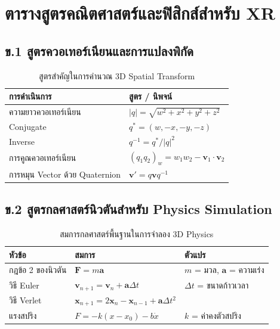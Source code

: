 \chapter{ตารางสูตรคณิตศาสตร์และฟิสิกส์สำหรับ XR}
\label{app:B}

\section*{ข.1 สูตรควอเทอร์เนียนและการแปลงพิกัด}

\begin{table}[H]
\centering
\caption{สูตรสำคัญในการคำนวณ 3D Spatial Transform}
\begin{tabularx}{\textwidth}{lY}
\toprule
\textbf{การดำเนินการ} & \textbf{สูตร / นิพจน์} \\
\midrule
ความยาวควอเทอร์เนียน & $|q| = \sqrt{w^2 + x^2 + y^2 + z^2}$ \\
Conjugate & $q^* = (w, -x, -y, -z)$ \\
Inverse & $q^{-1} = q^* / |q|^2$ \\
การคูณควอเทอร์เนียน & $(q_1 q_2)_w = w_1w_2 - \mathbf{v}_1\cdot\mathbf{v}_2$ \\
การหมุน Vector ด้วย Quaternion & $\mathbf{v'} = q \mathbf{v} q^{-1}$ \\
\bottomrule
\end{tabularx}
\end{table}

\section*{ข.2 สูตรกลศาสตร์นิวตันสำหรับ Physics Simulation}

\begin{table}[H]
\centering
\caption{สมการกลศาสตร์พื้นฐานในการจำลอง 3D Physics}
\begin{tabularx}{\textwidth}{lYY}
\toprule
\textbf{หัวข้อ} & \textbf{สมการ} & \textbf{ตัวแปร} \\
\midrule
กฎข้อ 2 ของนิวตัน & $\mathbf{F} = m\mathbf{a}$ & $m$ = มวล, $\mathbf{a}$ = ความเร่ง \\
วิธี Euler & $\mathbf{v}_{n+1} = \mathbf{v}_n + \mathbf{a}\Delta t$ & $\Delta t$ = ขนาดก้าวเวลา \\
วิธี Verlet & $\mathbf{x}_{n+1} = 2\mathbf{x}_n - \mathbf{x}_{n-1} + \mathbf{a}\Delta t^2$ & \\
แรงสปริง & $F = -k(x - x_0) - b\dot{x}$ & $k$ = ค่าคงตัวสปริง \\
\bottomrule
\end{tabularx}
\end{table}

